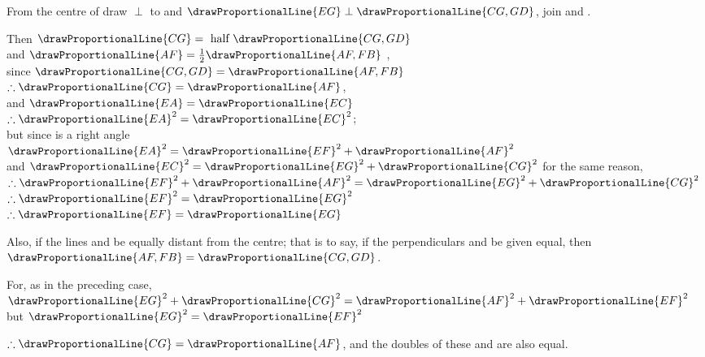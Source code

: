 \documentclass[booklanguage=english]{byrnebook}
\begin{document}
\begin{center}
From the centre of  draw  $\perp$ to  and $\drawProportionalLine{EG} \perp \drawProportionalLine{CG,GD}$, join  and .

Then $\drawProportionalLine{CG} = \mbox{ half } \drawProportionalLine{CG,GD}$ \\
and $\drawProportionalLine{AF} = \frac{1}{2} \drawProportionalLine{AF,FB}$ ,\\
since $\drawProportionalLine{CG,GD} = \drawProportionalLine{AF,FB}$ \byref{\hypref}\\
$\therefore \drawProportionalLine{CG} = \drawProportionalLine{AF}$,\\
and $\drawProportionalLine{EA} = \drawProportionalLine{EC}$ \\
$\therefore \drawProportionalLine{EA}^2 = \drawProportionalLine{EC}^2$;\\
but since  is a right angle\\
$\drawProportionalLine{EA}^2 = \drawProportionalLine{EF}^2 + \drawProportionalLine{AF}^2$ \\
and $\drawProportionalLine{EC}^2 = \drawProportionalLine{EG}^2 + \drawProportionalLine{CG}^2$ for the same reason,\\
$\therefore \drawProportionalLine{EF}^2 + \drawProportionalLine{AF}^2 = \drawProportionalLine{EG}^2 + \drawProportionalLine{CG}^2$\\
$\therefore \drawProportionalLine{EF}^2 = \drawProportionalLine{EG}^2$\\
$\therefore \drawProportionalLine{EF} = \drawProportionalLine{EG}$
\end{center}

Also, if the lines  and  be equally distant from the centre; that is to say, if the perpendiculars  and  be given equal, then $\drawProportionalLine{AF,FB} = \drawProportionalLine{CG,GD}$.

\begin{center}
For, as in the preceding case,\\
$\drawProportionalLine{EG}^2 + \drawProportionalLine{CG}^2 = \drawProportionalLine{AF}^2 + \drawProportionalLine{EF}^2$\\
but $\drawProportionalLine{EG}^2 = \drawProportionalLine{EF}^2$

$\therefore \drawProportionalLine{CG} = \drawProportionalLine{AF}$, %
and the doubles of these  and  are also equal.
\end{center}
\end{document}
